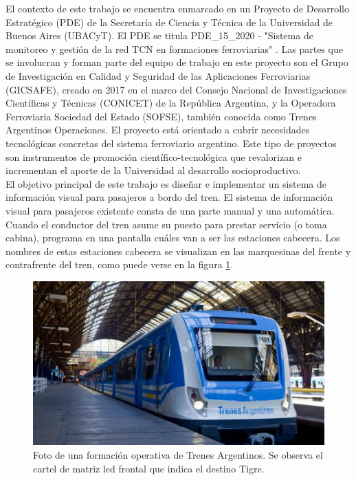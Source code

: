 El  contexto de este trabajo se encuentra enmarcado en un Proyecto de Desarrollo Estratégico (PDE) de la Secretaría de Ciencia y Técnica de la Universidad de Buenos Aires (UBACyT). El PDE se titula PDE\_15\_2020 - "Sistema de monitoreo y gestión de la red TCN en formaciones ferroviarias" \citep{PDE-TCN}. Las partes que se involucran y forman parte del equipo de trabajo en este proyecto son el Grupo de Investigación en Calidad y Seguridad de las Aplicaciones Ferroviarias (GICSAFE), creado en 2017 en el marco del Consejo Nacional de Investigaciones Científicas y Técnicas (CONICET) de la República Argentina, y la  Operadora Ferroviaria Sociedad del Estado (SOFSE), también conocida como Trenes Argentinos Operaciones. El proyecto está orientado a cubrir necesidades tecnológicas concretas del sistema ferroviario argentino. Este tipo de proyectos son instrumentos de promoción científico-tecnológica que revalorizan e incrementan el aporte de la Universidad al desarrollo socioproductivo.\\

El objetivo principal de este trabajo es diseñar e implementar un sistema de información visual para pasajeros a bordo del tren. El sistema de información visual para pasajeros existente consta de una parte manual y una automática. Cuando el conductor del tren asume su puesto para prestar servicio (o toma cabina), programa en una pantalla cuáles van a ser las estaciones cabecera. Los nombres de estas estaciones cabecera se visualizan en las marquesinas del frente y contrafrente del tren, como puede verse en la figura \ref{fig:tren}.

\begin{figure}[ht]
	\centering
	\includegraphics[width=1\textwidth]{./Figures/tren.jpg}
	\caption{Foto de una formación operativa de Trenes Argentinos. Se observa el cartel de matriz led frontal que indica el destino Tigre.}
	\label{fig:tren}
\end{figure}


